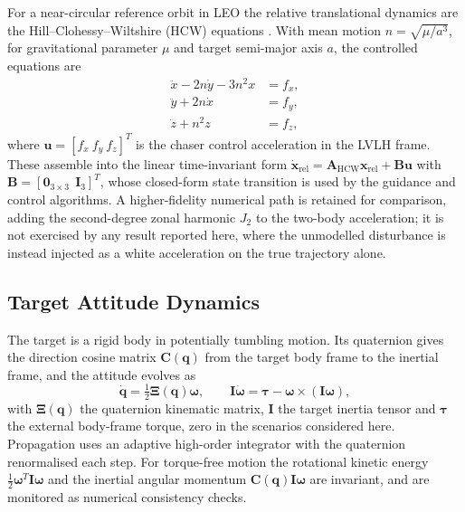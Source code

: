 For a near-circular reference orbit in LEO the relative translational
dynamics are the Hill--Clohessy--Wiltshire (HCW) equations
\cite{clohessy1960}. With mean motion $n=\sqrt{\mu/a^3}$, for gravitational
parameter $\mu$ and target semi-major axis $a$, the controlled equations are
\begin{equation}
\begin{aligned}
    \ddot{x} - 2n\dot{y} - 3n^2x &= f_x, \\
    \ddot{y} + 2n\dot{x} &= f_y, \\
    \ddot{z} + n^2z &= f_z,
\end{aligned}
\end{equation}
where $\mathbf{u}=[f_x\ f_y\ f_z]^{T}$ is the chaser control acceleration in
the LVLH frame. These assemble into the linear time-invariant form
$\dot{\mathbf{x}}_{\mathrm{rel}}
=\mathbf{A}_{\mathrm{HCW}}\mathbf{x}_{\mathrm{rel}}+\mathbf{B}\mathbf{u}$
with $\mathbf{B}=[\mathbf{0}_{3\times3}\ \ \mathbf{I}_{3}]^{T}$, whose
closed-form state transition is used by the guidance and control algorithms.
A higher-fidelity numerical path is retained for comparison, adding the
second-degree zonal harmonic $J_2$ to the two-body acceleration; it is not
exercised by any result reported here, where the unmodelled disturbance is
instead injected as a white acceleration on the true trajectory alone.

\subsection{Target Attitude Dynamics}

The target is a rigid body in potentially tumbling motion. Its quaternion
gives the direction cosine matrix $\mathbf{C}(\mathbf{q})$ from the target
body frame to the inertial frame, and the attitude evolves as
\begin{equation}
    \dot{\mathbf{q}}
    =
    \tfrac{1}{2}\mathbf{\Xi}(\mathbf{q})\boldsymbol{\omega},
    \qquad
    \mathbf{I}\dot{\boldsymbol{\omega}}
    =
    \boldsymbol{\tau}
    -\boldsymbol{\omega}\times(\mathbf{I}\boldsymbol{\omega}),
\end{equation}
with $\mathbf{\Xi}(\mathbf{q})$ the quaternion kinematic matrix, $\mathbf{I}$
the target inertia tensor and $\boldsymbol{\tau}$ the external body-frame
torque, zero in the scenarios considered here. Propagation uses an adaptive
high-order integrator with the quaternion renormalised each step. For
torque-free motion the rotational kinetic energy
$\tfrac{1}{2}\boldsymbol{\omega}^{T}\mathbf{I}\boldsymbol{\omega}$ and the
inertial angular momentum
$\mathbf{C}(\mathbf{q})\mathbf{I}\boldsymbol{\omega}$ are invariant, and are
monitored as numerical consistency checks.

